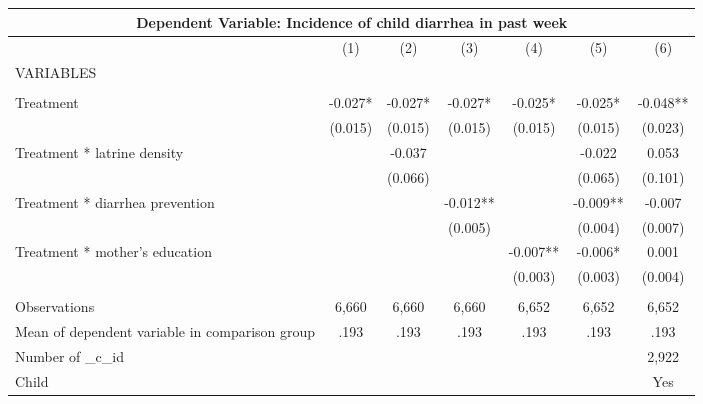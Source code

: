 \begin{tabular}{lcccccc}
\multicolumn{7}{c}{Dependent Variable: Incidence of child diarrhea in past week} \\ \hline
 & (1) & (2) & (3) & (4) & (5) & (6) \\
VARIABLES &  &  &  &  &  &  \\ \hline
 &  &  &  &  &  &  \\
Treatment & -0.027* & -0.027* & -0.027* & -0.025* & -0.025* & -0.048** \\
 & (0.015) & (0.015) & (0.015) & (0.015) & (0.015) & (0.023) \\
Treatment * latrine density &  & -0.037 &  &  & -0.022 & 0.053 \\
 &  & (0.066) &  &  & (0.065) & (0.101) \\
Treatment * diarrhea prevention &  &  & -0.012** &  & -0.009** & -0.007 \\
 &  &  & (0.005) &  & (0.004) & (0.007) \\
Treatment * mother's education &  &  &  & -0.007** & -0.006* & 0.001 \\
 &  &  &  & (0.003) & (0.003) & (0.004) \\
 &  &  &  &  &  &  \\
Observations & 6,660 & 6,660 & 6,660 & 6,652 & 6,652 & 6,652 \\
Mean of dependent variable in comparison group & .193 & .193 & .193 & .193 & .193 & .193 \\
Number of \_c\_id &  &  &  &  &  & 2,922 \\
 Child &  &  &  &  &  & Yes \\ \hline
\end{tabular}
